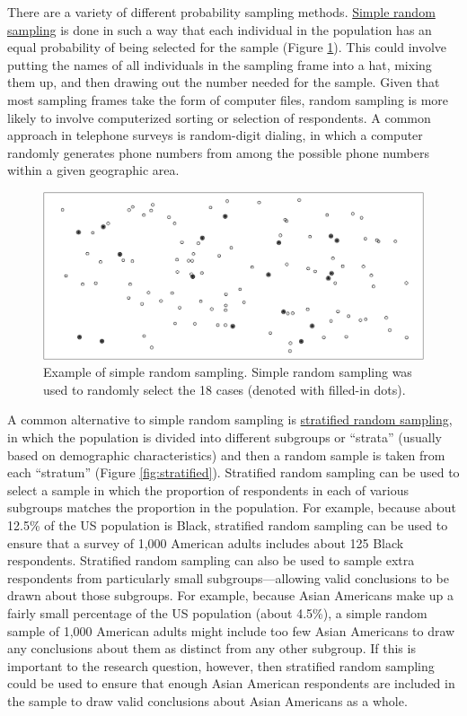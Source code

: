 \documentclass[
]{krantz}
\begin{document}
There are a variety of different probability sampling methods. \protect\hyperlink{simple-random-sampling}{Simple random sampling} is done in such a way that each individual in the population has an equal probability of being selected for the sample (Figure \ref{fig:simple}). This could involve putting the names of all individuals in the sampling frame into a hat, mixing them up, and then drawing out the number needed for the sample. Given that most sampling frames take the form of computer files, random sampling is more likely to involve computerized sorting or selection of respondents. A common approach in telephone surveys is random-digit dialing, in which a computer randomly generates phone numbers from among the possible phone numbers within a given geographic area.

\begin{figure}
\includegraphics[width=0.95\linewidth]{07-sampling_files/figure-latex/simple-1} \caption{Example of simple random sampling. Simple random sampling was used to randomly select the 18 cases (denoted with filled-in dots).}\label{fig:simple}
\end{figure}

A common alternative to simple random sampling is \protect\hyperlink{stratified-random-sampling}{stratified random sampling}, in which the population is divided into different subgroups or ``strata'' (usually based on demographic characteristics) and then a random sample is taken from each ``stratum'' (Figure \ref{fig:stratified}). Stratified random sampling can be used to select a sample in which the proportion of respondents in each of various subgroups matches the proportion in the population. For example, because about 12.5\% of the US population is Black, stratified random sampling can be used to ensure that a survey of 1,000 American adults includes about 125 Black respondents. Stratified random sampling can also be used to sample extra respondents from particularly small subgroups---allowing valid conclusions to be drawn about those subgroups. For example, because Asian Americans make up a fairly small percentage of the US population (about 4.5\%), a simple random sample of 1,000 American adults might include too few Asian Americans to draw any conclusions about them as distinct from any other subgroup. If this is important to the research question, however, then stratified random sampling could be used to ensure that enough Asian American respondents are included in the sample to draw valid conclusions about Asian Americans as a whole.
\end{document}

